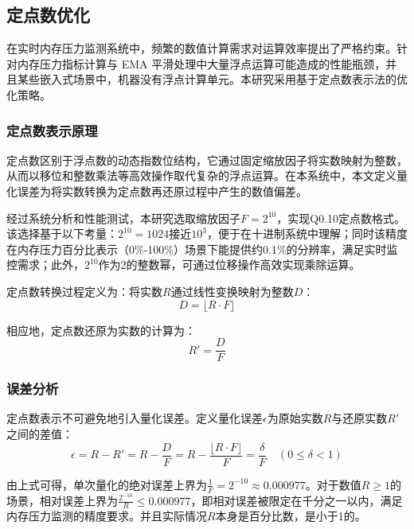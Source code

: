 \subsection{定点数优化}
\label{sec:fixed_point_optimization}

在实时内存压力监测系统中，频繁的数值计算需求对运算效率提出了严格约束。针对内存压力指标计算与 EMA 平滑处理中大量浮点运算可能造成的性能瓶颈，并且某些嵌入式场景中，机器没有浮点计算单元。本研究采用基于定点数表示法的优化策略。

\subsubsection{定点数表示原理}

定点数区别于浮点数的动态指数位结构，它通过固定缩放因子将实数映射为整数，从而以移位和整数乘法等高效操作取代复杂的浮点运算。在本系统中，本文定义量化误差为将实数转换为定点数再还原过程中产生的数值偏差。

经过系统分析和性能测试，本研究选取缩放因子$F=2^{10}$，实现Q0.10定点数格式。该选择基于以下考量：$2^{10}=1024$接近$10^3$，便于在十进制系统中理解；同时该精度在内存压力百分比表示（0\%-100\%）场景下能提供约0.1\%的分辨率，满足实时监控需求；此外，$2^{10}$作为2的整数幂，可通过位移操作高效实现乘除运算。

定点数转换过程定义为：将实数$R$通过线性变换映射为整数$D$：
\begin{equation}
D = \lfloor R \cdot F \rfloor
\end{equation}

相应地，定点数还原为实数的计算为：
\begin{equation}
R' = \frac{D}{F}
\end{equation}

\subsubsection{误差分析}

定点数表示不可避免地引入量化误差。定义量化误差$\epsilon$为原始实数$R$与还原实数$R'$之间的差值：
\begin{equation}
\epsilon = R - R' = R - \frac{D}{F} = R - \frac{\lfloor R \cdot F \rfloor}{F} = \frac{\delta}{F} \quad (0 \leq \delta < 1)
\end{equation}

由上式可得，单次量化的绝对误差上界为$\frac{1}{F} = 2^{-10} \approx 0.000977$。对于数值$R \geq 1$的场景，相对误差上界为$\frac{2^{-10}}{R} \leq 0.000977$，即相对误差被限定在千分之一以内，满足内存压力监测的精度要求。并且实际情况\(R\)本身是百分比数，是小于1的。

